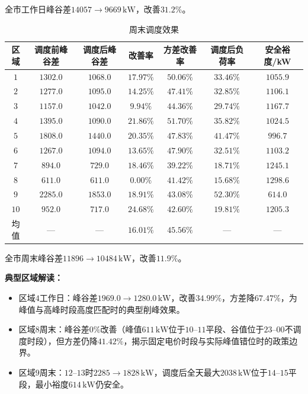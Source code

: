 \documentclass[a4paper,12pt]{ctexart}
\begin{document}
全市工作日峰谷差$14057\to9669\,\mathrm{kW}$，改善$\mathbf{31.2\%}$。

\begin{table}[H]
\centering
\caption{周末调度效果}
\begin{tabular}{ccccccc}
\toprule
区域 & 调度前峰谷差 & 调度后峰谷差 & 改善率 & 方差改善率 & 调度后负荷率 & 安全裕度/kW \\
\midrule
$1$ & $1302.0$ & $1068.0$ & $17.97\%$ & $50.06\%$ & $33.46\%$ & $1055.9$ \\
$2$ & $1277.0$ & $1095.0$ & $14.25\%$ & $47.41\%$ & $32.85\%$ & $1106.1$ \\
$3$ & $1157.0$ & $1042.0$ & $9.94\%$ & $44.36\%$ & $29.74\%$ & $1167.7$ \\
$4$ & $1395.0$ & $1090.0$ & $21.86\%$ & $51.70\%$ & $35.82\%$ & $1024.5$ \\
$5$ & $1808.0$ & $1440.0$ & $20.35\%$ & $47.83\%$ & $41.47\%$ & $996.7$ \\
$6$ & $1267.0$ & $1094.0$ & $13.65\%$ & $47.90\%$ & $32.51\%$ & $1103.2$ \\
$7$ & $894.0$ & $729.0$ & $18.46\%$ & $39.22\%$ & $18.71\%$ & $1245.1$ \\
$8$ & $611.0$ & $611.0$ & $0.00\%$ & $41.42\%$ & $15.68\%$ & $1298.6$ \\
$9$ & $2285.0$ & $1853.0$ & $18.91\%$ & $43.08\%$ & $52.30\%$ & $614.0$ \\
$10$ & $952.0$ & $717.0$ & $24.68\%$ & $42.60\%$ & $19.81\%$ & $1205.3$ \\
\midrule
均值 & --- & --- & $\mathbf{16.01\%}$ & $\mathbf{45.56\%}$ & --- & --- \\
\bottomrule
\end{tabular}
\end{table}

全市周末峰谷差$11896\to10484\,\mathrm{kW}$，改善$\mathbf{11.9\%}$。


\textbf{典型区域解读：}
\begin{itemize}
\item 区域$4$工作日：峰谷差$1969.0\to1280.0\,\mathrm{kW}$，改善$34.99\%$，方差降$67.47\%$，为峰值与高峰时段高度匹配时的典型削峰效果。
\item 区域$8$周末：峰谷差$0\%$改善（峰值$611\,\mathrm{kW}$位于$10\text{--}11$平段、谷值位于$23\text{--}00$不调度时段），但方差仍降$41.42\%$，揭示固定电价时段与实际峰值错位时的政策边界。
\item 区域$9$周末：$12\text{--}13$时$2285\to1828\,\mathrm{kW}$，调度后全天最大$2038\,\mathrm{kW}$位于$14\text{--}15$平段，最小裕度$614\,\mathrm{kW}$仍安全。
\end{itemize}
\end{document}
